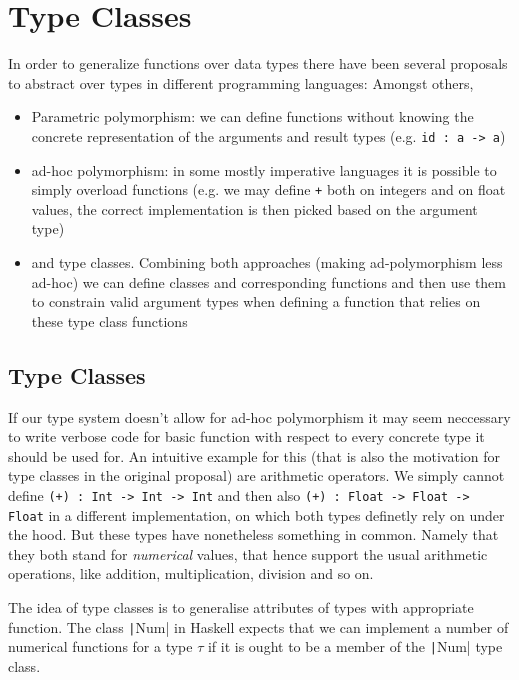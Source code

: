 \chapter{Type Classes}\label{ch:typeclasses}

In order to generalize functions over data types there have been several proposals to abstract over types in different programming languages:
Amongst others,
\begin{itemize}
\item Parametric polymorphism: we can define functions without knowing the concrete representation of the arguments and result types (e.g. \texttt{id : a -> a}) %
\item ad-hoc polymorphism: in some mostly imperative languages it is possible to simply overload functions (e.g. we may define \texttt{+} both on integers and on float values, the correct implementation is then picked based on the argument type) %
\item and type classes. Combining both approaches (making ad-polymorphism less ad-hoc) we can define classes and corresponding functions and then use them to constrain valid argument types when defining a function that relies on these type class functions \cite{wadlerblott}
\end{itemize}

\section{Type Classes}\label{sec:typeclasses}

If our type system doesn't allow for ad-hoc polymorphism it may seem neccessary to write verbose code for basic function with respect to every concrete type it should be used for.
An intuitive example for this (that is also the motivation for type classes in the original proposal) are arithmetic operators.
We simply cannot define \texttt{(+) : Int -> Int -> Int} and then also \texttt{(+) : Float -> Float -> Float} in a different implementation, on which both types definetly rely on under the hood.
But these types have nonetheless something in common. Namely that they both stand for \emph{numerical} values, that hence support the usual arithmetic operations, like addition, multiplication, division and so on.

The idea of type classes is to generalise attributes of types with appropriate function.
The class \texttt|Num| in Haskell expects that we can implement a number of numerical functions for a type $\tau$ if it is ought to be a member of the \texttt|Num| type class.

